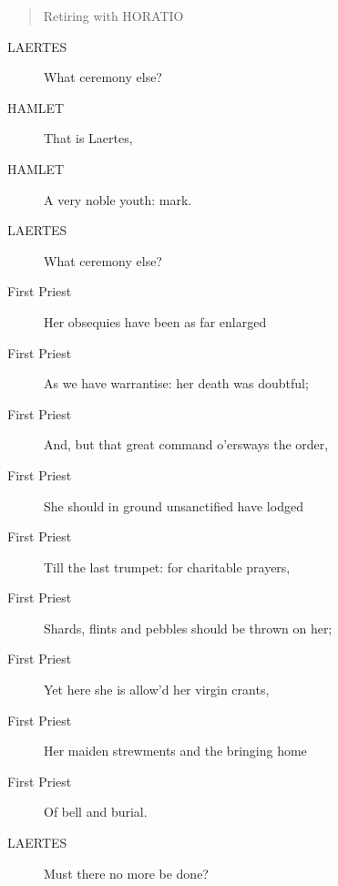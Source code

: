 \documentclass{article}
\begin{document}
\begin{quote}
Retiring with HORATIO
\end{quote}
          
\begin{description}
            
\item[LAERTES] What ceremony else?
\end{description}
          
\begin{description}
            
\item[HAMLET] That is Laertes,
\item[HAMLET] A very noble youth: mark.
\end{description}
          
\begin{description}
            
\item[LAERTES] What ceremony else?
\end{description}
          
\begin{description}
            
\item[First Priest] Her obsequies have been as far enlarged
\item[First Priest] As we have warrantise: her death was doubtful;
\item[First Priest] And, but that great command o'ersways the order,
\item[First Priest] She should in ground unsanctified have lodged
\item[First Priest] Till the last trumpet: for charitable prayers,
\item[First Priest] Shards, flints and pebbles should be thrown on her;
\item[First Priest] Yet here she is allow'd her virgin crants,
\item[First Priest] Her maiden strewments and the bringing home
\item[First Priest] Of bell and burial.
\end{description}
          
\begin{description}
            
\item[LAERTES] Must there no more be done?
\end{description}
          
\end{document}

